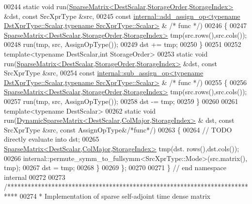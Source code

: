 \begin{DoxyCode}
00244   \textcolor{keyword}{static} \textcolor{keywordtype}{void} run(\hyperlink{group___sparse_core___module_class_eigen_1_1_sparse_matrix}{SparseMatrix<DestScalar,StorageOrder,StorageIndex>}
       &dst, \textcolor{keyword}{const} SrcXprType &src,
00245                   \textcolor{keyword}{const} 
      \hyperlink{struct_eigen_1_1internal_1_1add__assign__op}{internal::add\_assign\_op<typename DstXprType::Scalar,typename SrcXprType::Scalar>}
      & \textcolor{comment}{/* func */})
00246   \{
00247     \hyperlink{group___sparse_core___module_class_eigen_1_1_sparse_matrix}{SparseMatrix<DestScalar,StorageOrder,StorageIndex>} 
      tmp(src.rows(),src.cols());
00248     run(tmp, src, AssignOpType());
00249     dst += tmp;
00250   \}
00251 
00252   \textcolor{keyword}{template}<\textcolor{keyword}{typename} DestScalar,\textcolor{keywordtype}{int} StorageOrder>
00253   \textcolor{keyword}{static} \textcolor{keywordtype}{void} run(\hyperlink{group___sparse_core___module_class_eigen_1_1_sparse_matrix}{SparseMatrix<DestScalar,StorageOrder,StorageIndex>}
       &dst, \textcolor{keyword}{const} SrcXprType &src,
00254                   \textcolor{keyword}{const} 
      \hyperlink{struct_eigen_1_1internal_1_1sub__assign__op}{internal::sub\_assign\_op<typename DstXprType::Scalar,typename SrcXprType::Scalar>}
      & \textcolor{comment}{/* func */})
00255   \{
00256     \hyperlink{group___sparse_core___module_class_eigen_1_1_sparse_matrix}{SparseMatrix<DestScalar,StorageOrder,StorageIndex>} 
      tmp(src.rows(),src.cols());
00257     run(tmp, src, AssignOpType());
00258     dst -= tmp;
00259   \}
00260   
00261   \textcolor{keyword}{template}<\textcolor{keyword}{typename} DestScalar>
00262   \textcolor{keyword}{static} \textcolor{keywordtype}{void} run(\hyperlink{class_eigen_1_1_dynamic_sparse_matrix}{DynamicSparseMatrix<DestScalar,ColMajor,StorageIndex>}
      & dst, \textcolor{keyword}{const} SrcXprType &src, \textcolor{keyword}{const} AssignOpType&\textcolor{comment}{/*func*/})
00263   \{
00264     \textcolor{comment}{// TODO directly evaluate into dst;}
00265     \hyperlink{group___sparse_core___module_class_eigen_1_1_sparse_matrix}{SparseMatrix<DestScalar,ColMajor,StorageIndex>} tmp(dst.
      rows(),dst.cols());
00266     internal::permute\_symm\_to\_fullsymm<SrcXprType::Mode>(src.matrix(), tmp);
00267     dst = tmp;
00268   \}
00269 \};
00270 
00271 \} \textcolor{comment}{// end namespace internal}
00272 
00273 \textcolor{comment}{/***************************************************************************}
00274 \textcolor{comment}{* Implementation of sparse self-adjoint time dense matrix}

\end{DoxyCode}
